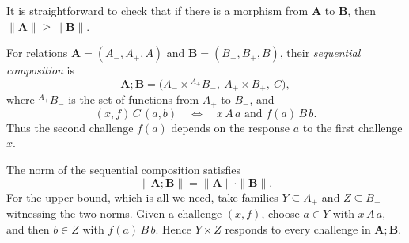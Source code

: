 It is straightforward to check that if there is a morphism from $\mathbf A$ to $\mathbf B$, then $\|\mathbf A\|\geq\|\mathbf B\|$.

\begin{definition}
\label{def:sequential-composition}
For relations $\mathbf A=(A_-,A_+,A)$ and $\mathbf B=(B_-,B_+,B)$,
their \emph{sequential composition} is
\[
 \mathbf A;\mathbf B
 =\bigl(A_-\times{}^{A_+}B_-,\ A_+\times B_+,\ C\bigr),
\]
where ${}^{A_+}B_-$ is the set of functions from $A_+$ to $B_-$, and
\[
 (x,f)\,C\,(a,b)
 \quad\Longleftrightarrow\quad x\,A\,a\text{ and }f(a)\,B\,b.
\]
Thus the second challenge $f(a)$ depends on the response $a$ to the
first challenge $x$.
\end{definition}

\begin{remark}
\label{rem:sequential-norm}
The norm of the sequential composition satisfies
\[
 \|\mathbf A;\mathbf B\|=\|\mathbf A\|\cdot\|\mathbf B\|.
\]
For the upper bound, which is all we need, take families $Y\subseteq A_+$
and $Z\subseteq B_+$ witnessing the two norms. Given a challenge $(x,f)$,
choose $a\in Y$ with $x\,A\,a$, and then $b\in Z$ with $f(a)\,B\,b$.
Hence $Y\times Z$ responds to every challenge in $\mathbf A;\mathbf B$.
\end{remark}
